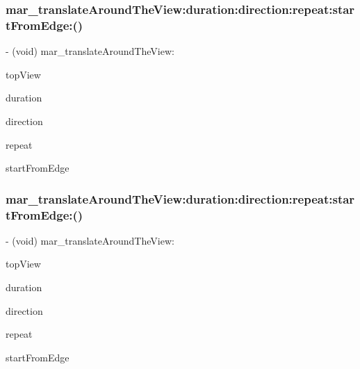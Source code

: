 \subsubsection{\texorpdfstring{mar\+\_\+translate\+Around\+The\+View\+:duration\+:direction\+:repeat\+:start\+From\+Edge\+:()}{mar\_translateAroundTheView:duration:direction:repeat:startFromEdge:()}\hspace{0.1cm}{\footnotesize\ttfamily [1/2]}}
{\footnotesize\ttfamily -\/ (void) mar\+\_\+translate\+Around\+The\+View\+: \begin{DoxyParamCaption}\item[{(U\+I\+View $\ast$)}]{top\+View }\item[{duration:(C\+G\+Float)}]{duration }\item[{direction:(M\+A\+R\+U\+I\+View\+Animation\+Translation\+Direction)}]{direction }\item[{repeat:(B\+O\+OL)}]{repeat }\item[{startFromEdge:(B\+O\+OL)}]{start\+From\+Edge }\end{DoxyParamCaption}\hspace{0.3cm}{\ttfamily [implementation]}}

\mbox{\label{category_u_i_view_07_m_a_r_e_x___animation_08_a1a3a47e969aee9116a75a8d12eed71c1}} 
\subsubsection{\texorpdfstring{mar\+\_\+translate\+Around\+The\+View\+:duration\+:direction\+:repeat\+:start\+From\+Edge\+:()}{mar\_translateAroundTheView:duration:direction:repeat:startFromEdge:()}\hspace{0.1cm}{\footnotesize\ttfamily [2/2]}}
{\footnotesize\ttfamily -\/ (void) mar\+\_\+translate\+Around\+The\+View\+: \begin{DoxyParamCaption}\item[{(U\+I\+View $\ast$\+\_\+\+Nonnull)}]{top\+View }\item[{duration:(C\+G\+Float)}]{duration }\item[{direction:(M\+A\+R\+U\+I\+View\+Animation\+Translation\+Direction)}]{direction }\item[{repeat:(B\+O\+OL)}]{repeat }\item[{startFromEdge:(B\+O\+OL)}]{start\+From\+Edge }\end{DoxyParamCaption}}

